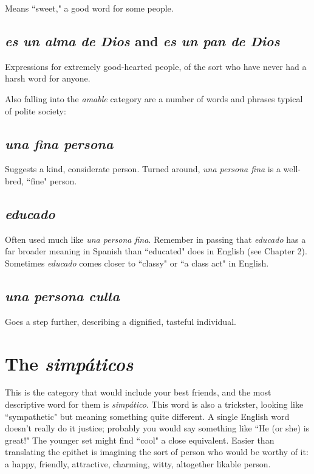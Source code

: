 Means ``sweet," a good word for some people.

\subsection{\emph{es un alma de Dios} and \emph{es un pan de Dios}}

Expressions
for extremely good-hearted people, of the sort who have never had a
harsh word for anyone.

\bsk

Also falling into the \emph{amable} category are a number of words
and phrases typical of polite society:

\subsection{\emph{una fina persona}}

Suggests a kind, considerate person.
Turned around, \emph{una persona fina} is a well-bred, ``fine" person.

\subsection{\emph{educado}}

Often used much like \emph{una persona fina}. Remember in passing that \emph{educado} has a far broader meaning in Spanish than
``educated" does in English (see Chapter 2). Sometimes \emph{educado} comes
closer to ``classy" or ``a class act" in English.

\subsection{\emph{una persona culta}}

Goes a step further, describing a dignified, tasteful individual.

\section{The \emph{simpáticos}}

This is the category that would include your best friends, and
the most descriptive word for them is \emph{simpático}. This word is also a
trickster, looking like ``sympathetic" but meaning something quite different. A single English word doesn't really do it justice; probably you
would say something like ``He (or she) is great!" The younger set might
find ``cool" a close equivalent. Easier than translating the epithet is
imagining the sort of person who would be worthy of it: a happy,
friendly, attractive, charming, witty, altogether likable person.

